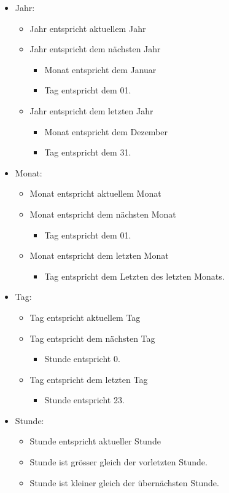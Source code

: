 \newpage
\begin{itemize}
\item Jahr: 
	\begin{itemize}
		\item Jahr entspricht aktuellem Jahr
		\item Jahr entspricht dem nächsten Jahr
			\begin{itemize}
				\item Monat entspricht dem Januar
				\item Tag entspricht dem 01.
			\end{itemize}
		\item Jahr entspricht dem letzten Jahr
			\begin{itemize}
				\item Monat entspricht dem Dezember
				\item Tag entspricht dem 31.
			\end{itemize}
	\end{itemize}
\item Monat:
	\begin{itemize}
		\item Monat entspricht aktuellem Monat
		\item Monat entspricht dem nächsten Monat
			\begin{itemize}
				\item Tag entspricht dem 01.
			\end{itemize}
		\item Monat entspricht dem letzten Monat
			\begin{itemize}
				\item Tag entspricht dem Letzten des letzten Monats.
			\end{itemize}
	\end{itemize}
\item Tag:
\begin{itemize}
	\item Tag entspricht aktuellem Tag
	\item Tag entspricht dem nächsten Tag
		\begin{itemize}
			\item Stunde entspricht 0.
		\end{itemize}
	\item Tag entspricht dem letzten Tag
		\begin{itemize}
			\item Stunde entspricht 23.
		\end{itemize}
\end{itemize}
\item Stunde:
	\begin{itemize}
		\item Stunde entspricht aktueller Stunde
		\item Stunde ist grösser gleich der vorletzten Stunde.
		\item Stunde ist kleiner gleich der übernächsten Stunde.
	\end{itemize}
\end{itemize}

